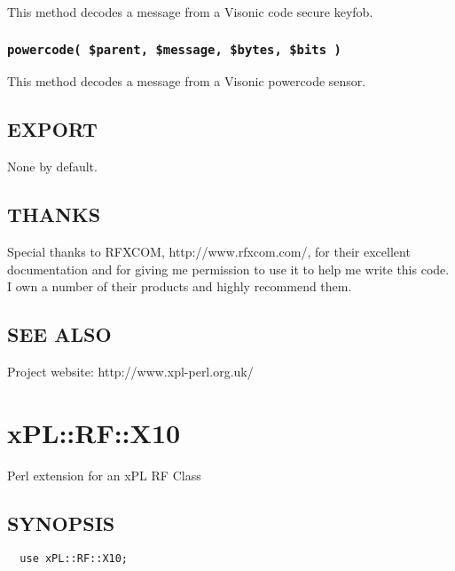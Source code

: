 This method decodes a message from a Visonic code secure keyfob.

\subsubsection*{\texttt{powercode( \$parent, \$message, \$bytes, \$bits )}\label{xPL::RF::Visonic_powercode_parent_message_bytes_bits_}}


This method decodes a message from a Visonic powercode sensor.

\subsection*{EXPORT\label{xPL::RF::Visonic_EXPORT}}


None by default.

\subsection*{THANKS\label{xPL::RF::Visonic_THANKS}}


Special thanks to RFXCOM, \textsf{http://www.rfxcom.com/}, for their
excellent documentation and for giving me permission to use it to help
me write this code.  I own a number of their products and highly
recommend them.

\subsection*{SEE ALSO\label{xPL::RF::Visonic_SEE_ALSO}}


Project website: http://www.xpl-perl.org.uk/

\section{xPL::RF::X10\label{xPL::RF::X10}}


Perl extension for an xPL RF Class

\subsection*{SYNOPSIS\label{xPL::RF::X10_SYNOPSIS}}
\begin{verbatim}
  use xPL::RF::X10;
\end{verbatim}
